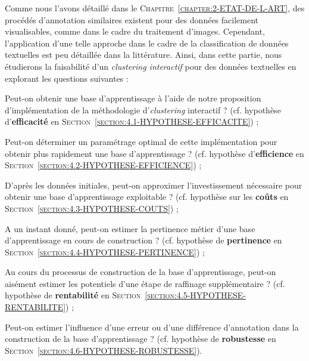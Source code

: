 	Comme nous l'avons détaillé dans le \textsc{Chapitre~\ref{chapter:2-ETAT-DE-L-ART}}, des procédés d'annotation similaires existent pour des données facilement visualisables, comme dans le cadre du traitement d'images. Cependant, l'application d'une telle approche dans le cadre de la classification de données textuelles est peu détaillée dans la littérature. Ainsi, dans cette partie, nous étudierons la faisabilité d'un \textit{clustering interactif} pour des données textuelles en explorant les questions suivantes :
	\begin{leftBarImportantRed}
		\begin{todolist}
			\item Peut-on obtenir une base d'apprentissage à l'aide de notre proposition d'implémentation de la méthodologie d'\textit{clustering} interactif ? (cf. hypothèse d'\textbf{efficacité} en \textsc{Section~\ref{section:4.1-HYPOTHESE-EFFICACITE}}) ;
			\item Peut-on déterminer un paramétrage optimal de cette implémentation pour obtenir plus rapidement une base d'apprentissage ? (cf. hypothèse d'\textbf{efficience} en \textsc{Section~\ref{section:4.2-HYPOTHESE-EFFICIENCE}}) ;
			\item D'après les données initiales, peut-on approximer l'investissement nécessaire pour obtenir une base d'apprentissage exploitable ? (cf. hypothèse sur les \textbf{coûts} en \textsc{Section~\ref{section:4.3-HYPOTHESE-COUTS}}) ;
			\item A un instant donné, peut-on estimer la pertinence métier d'une base d'apprentissage en cours de construction ? (cf. hypothèse de \textbf{pertinence} en \textsc{Section~\ref{section:4.4-HYPOTHESE-PERTINENCE}}) ;
			\item Au cours du processus de construction de la base d'apprentissage, peut-on aisément estimer les potentiels d'une étape de raffinage supplémentaire ? (cf. hypothèse de \textbf{rentabilité} en \textsc{Section~\ref{section:4.5-HYPOTHESE-RENTABILITE}}) ;
			\item Peut-on estimer l'influence d'une erreur ou d'une différence d'annotation dans la construction de la base d'apprentissage ? (cf. hypothèse de \textbf{robustesse} en \textsc{Section~\ref{section:4.6-HYPOTHESE-ROBUSTESSE}}).
		\end{todolist}
	\end{leftBarImportantRed}
	
